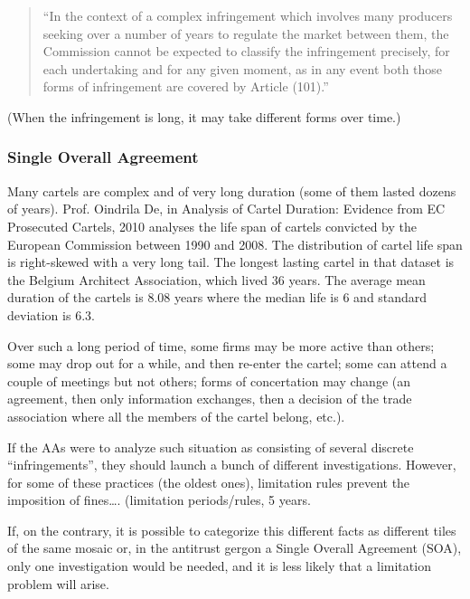             \begin{quote}
            ``In the context of a complex infringement which involves many producers seeking over a number of years to regulate the market between them, the Commission cannot be expected to classify the infringement precisely, for each undertaking and for any given moment, as in any event both those forms of infringement are covered by Article (101).''
            \end{quote}
            
            \noindent (When the infringement is long, it may take different forms over time.)

        \subsubsection{Single Overall Agreement}

            Many cartels are complex and of very long duration (some of them lasted dozens of years). Prof. Oindrila De, in Analysis of Cartel Duration: Evidence from EC Prosecuted Cartels, 2010 analyses the life span of cartels convicted by the European Commission between 1990 and 2008. The distribution of cartel life span is right-skewed with a very long tail. The longest lasting cartel in that dataset is the Belgium Architect Association, which lived 36 years. The average mean duration of the cartels is 8.08 years where the median life is 6 and standard deviation is 6.3.

            Over such a long period of time, some firms may be more active than others; some may drop out for a while, and then re-enter the cartel; some can attend a couple of meetings but not others; forms of concertation may change (an agreement, then only information exchanges, then a decision of the trade association where all the members of the cartel belong, etc.).

            If the AAs were to analyze such situation as consisting of several discrete “infringements”, they should launch a bunch of different investigations. However, for some of these practices (the oldest ones), limitation rules prevent the imposition of fines…. (limitation periods/rules, 5 years.

            If, on the contrary, it is possible to categorize this different facts as different tiles of the same mosaic or, in the antitrust gergon a Single Overall Agreement (SOA), only one investigation would be needed, and it is less likely that a limitation problem will arise.

